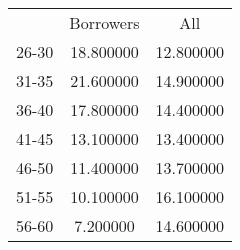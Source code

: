 \begin{tabular}{lcc}
 & Borrowers & All \\
26-30 & 18.800000 & 12.800000 \\
31-35 & 21.600000 & 14.900000 \\
36-40 & 17.800000 & 14.400000 \\
41-45 & 13.100000 & 13.400000 \\
46-50 & 11.400000 & 13.700000 \\
51-55 & 10.100000 & 16.100000 \\
56-60 & 7.200000 & 14.600000 \\
\end{tabular}
